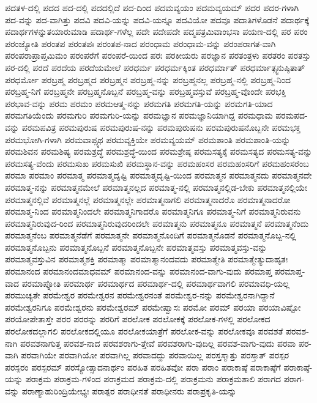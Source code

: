 {ಪದತಳ-ದಲ್ಲಿ
ಪದದ
ಪದ-ದಲ್ಲಿ
ಪದದಲ್ಲಿದೆ
ಪದ-ದಿಂದ
ಪದಮವ್ಯಯಂ
ಪದಮವ್ಯಯಮ್
ಪದರ
ಪದರ-ಗಳಾಗಿ
ಪದ-ವನ್ನು
ಪದ-ವಾಗಿತ್ತು
ಪದವಿ
ಪದವಿ-ಯನ್ನು
ಪದವಿ-ಯನ್ನೂ
ಪದವಿಯೋ
ಪದವೂ
ಪದಾತಿಗಳೊಡನೆ
ಪದಾರ್ಥಕ್ಕೆ
ಪದಾರ್ಥಗಳನ್ನುತಯಾರುಮಾಡಿ
ಪದಾರ್ಥ-ಗಳೆಲ್ಲ
ಪದೇ
ಪದೇಪದೇ
ಪದ್ಮಪತ್ರಮಿವಾಂಭಸಾ
ಪಯಣ-ದಲ್ಲಿ
ಪರ
ಪರಂ
ಪರಂಜ್ಯೋತಿ
ಪರಂತಪ
ಪರಂತಪಃ
ಪರಂತಪ-ನಾದ
ಪರಂಧಾಮ
ಪರಂಧಾಮ-ವನ್ನು
ಪರಂಪರಾಗತ-ವಾಗಿ
ಪರಂಪರಾಪ್ರಾಪ್ತಮಿಮಂ
ಪರಂಪರೆಗೆ
ಪರಂಪರೆ-ಯಿಂದ
ಪರಃ
ಪರಕೀಯರು
ಪರಜ್ಞಾನ
ಪರತಂತ್ರಳು
ಪರತರಂ
ಪರತಸ್ತು
ಪರ-ದಲ್ಲಿ
ಪರದೆ
ಪರದೆಯ
ಪರದೆಯಮೇಲೆ
ಪರಧರ್ಮ
ಪರಧರ್ಮಕ್ಕಿಂತ
ಪರಧರ್ಮಾತ್
ಪರಧರ್ಮಾತ್ಸ್ವನುಷ್ಠಿತಾತ್
ಪರಧರ್ಮೋ
ಪರಬ್ರಹ್ಮ
ಪರಬ್ರಹ್ಮದ
ಪರಬ್ರಹ್ಮನ
ಪರಬ್ರಹ್ಮ-ನನ್ನು
ಪರಬ್ರಹ್ಮನಲ್ಲ
ಪರಬ್ರಹ್ಮ-ನಲ್ಲಿ
ಪರಬ್ರಹ್ಮ-ನಿಂದ
ಪರಬ್ರಹ್ಮ-ನಿಗೆ
ಪರಬ್ರಹ್ಮನೇ
ಪರಬ್ರಹ್ಮನೊಬ್ಬನೆ
ಪರಬ್ರಹ್ಮ-ವನ್ನು
ಪರಬ್ರಹ್ಮವಸ್ತುವೆ
ಪರಬ್ರಹ್ಮ-ವೊಂದೇ
ಪರಭಕ್ತಿ
ಪರಭಾವ-ವನ್ನು
ಪರಮ
ಪರಮಂ
ಪರಮಆತ್ಮ-ನನ್ನು
ಪರಮಗತಿ
ಪರಮಗತಿ-ಯನ್ನು
ಪರಮಗತಿ-ಯಾದ
ಪರಮಗತಿಯೆಂದು
ಪರಮಗುರಿ
ಪರಮಗುರಿ-ಯನ್ನು
ಪರಮಜ್ಞಾನ
ಪರಮಜ್ಞಾನಿಯಾಗಿದ್ದ
ಪರಮಧಾಮ
ಪರಮಪದ-ವನ್ನು
ಪರಮಪವಿತ್ರ
ಪರಮಪುರುಷ
ಪರಮಪುರುಷ-ನನ್ನು
ಪರಮಪುರುಷನು
ಪರಮಪುರುಷನೊಬ್ಬನೇ
ಪರಮಭಕ್ತ
ಪರಮಭೋಗಿ-ಗಳಾಗಿ
ಪರಮವಾಪ್ಸ್ಯಥ
ಪರಮವ್ಯಕ್ತಿಯೇ
ಪರಮವ್ಯಯಮ್
ಪರಮಶಾಂತಿ
ಪರಮಶಾಂತಿ-ಯನ್ನು
ಪರಮಶಿವನ
ಪರಮಶಿಷ್ಯ
ಪರಮಶ್ರದ್ಧೆ
ಪರಮಶ್ರದ್ಧೆ-ಯಿಂದ
ಪರಮಶ್ರೇಷ್ಠ
ಪರಮಸತ್ಯಕ್ಕೆ
ಪರಮಸತ್ಯದ
ಪರಮಸತ್ಯ-ವನ್ನು
ಪರಮಸತ್ಯ-ವೆಂದು
ಪರಮಸುಖ
ಪರಮಸುಖಿ
ಪರಮಸ್ಥಾನ-ವನ್ನು
ಪರಮಹಂಸರ
ಪರಮಹಂಸರಿಗೆ
ಪರಮಹಂಸರೆಂಬ
ಪರಮಾ
ಪರಮಾಂ
ಪರಮಾತ್ಮ
ಪರಮಾತ್ಮದೃಷ್ಟಿ
ಪರಮಾತ್ಮದೃಷ್ಟಿ-ಯಿಂದ
ಪರಮಾತ್ಮನ
ಪರಮಾತ್ಮನದು
ಪರಮಾತ್ಮನದೇ
ಪರಮಾತ್ಮ-ನನ್ನು
ಪರಮಾತ್ಮನಮೇಲೆ
ಪರಮಾತ್ಮನಲ್ಲದ
ಪರಮಾತ್ಮ-ನಲ್ಲಿ
ಪರಮಾತ್ಮನಲ್ಲಿಡ-ಬೇಕು
ಪರಮಾತ್ಮನಲ್ಲಿಯೇ
ಪರಮಾತ್ಮನಲ್ಲಿವೆ
ಪರಮಾತ್ಮನಲ್ಲೆ
ಪರಮಾತ್ಮನಲ್ಲೇ
ಪರಮಾತ್ಮನಾಗಲಿ
ಪರಮಾತ್ಮನಾದರೊ
ಪರಮಾತ್ಮನಾದರೋ
ಪರಮಾತ್ಮ-ನಿಂದ
ಪರಮಾತ್ಮನಿಂದಲೇ
ಪರಮಾತ್ಮನಿಗಾದರೊ
ಪರಮಾತ್ಮನಿಗೂ
ಪರಮಾತ್ಮ-ನಿಗೆ
ಪರಮಾತ್ಮನಿರುವನು
ಪರಮಾತ್ಮನಿರುವುದ-ರಿಂದ
ಪರಮಾತ್ಮನಿರುವುದರಿಂದಲೇ
ಪರಮಾತ್ಮನು
ಪರಮಾತ್ಮನೂ
ಪರಮಾತ್ಮನೆ
ಪರಮಾತ್ಮನೆಂದು
ಪರಮಾತ್ಮನೆಂಬ
ಪರಮಾತ್ಮನೆಡೆಗೆ
ಪರಮಾತ್ಮನೇ
ಪರಮಾತ್ಮನೊಂದಿಗೆ
ಪರಮಾತ್ಮನೊಡನೆ
ಪರಮಾತ್ಮನೊಬ್ಬ-ನಲ್ಲಿ
ಪರಮಾತ್ಮನೊಬ್ಬನು
ಪರಮಾತ್ಮನೊಬ್ಬನೆ
ಪರಮಾತ್ಮನೊಬ್ಬನೇ
ಪರಮಾತ್ಮವಸ್ತು
ಪರಮಾತ್ಮವಸ್ತು-ವನ್ನು
ಪರಮಾತ್ಮವಸ್ತುವಿನ
ಪರಮಾತ್ಮಶಕ್ತಿ
ಪರಮಾತ್ಮಾ
ಪರಮಾತ್ಮಾನಂದವದು
ಪರಮಾತ್ಮೇತಿ
ಪರಮಾತ್ಮೇತ್ಯುದಾಹೃತಃ
ಪರಮಾನಂದ
ಪರಮಾನಂದಮಾಧವಮ್
ಪರಮಾನಂದ-ವನ್ನು
ಪರಮಾನಂದ-ವಾಗು-ವುದು
ಪರಮಾಪ್ತ
ಪರಮಾಪ್ತ-ವಾದ
ಪರಮಾಪ್ನೋತಿ
ಪರಮಾರ್ಥ
ಪರಮಾರ್ಥದ
ಪರಮಾರ್ಥ-ದಲ್ಲಿ
ಪರಮಾರ್ಥವಾಗಲಿ
ಪರಮಾವಧಿ-ಯಲ್ಲ
ಪರಮುಚ್ಯತೇ
ಪರಮೇಶ್ವರ
ಪರಮೇಶ್ವರನ
ಪರಮೇಶ್ವರನಂತೆ
ಪರಮೇಶ್ವರ-ನನ್ನು
ಪರಮೇಶ್ವರನಾಗಿದ್ದಾನೆ
ಪರಮೇಶ್ವರನಿಗೂ
ಪರಮೇಶ್ವರನು
ಪರಮೇಶ್ವರಮ್
ಪರಮೇಷ್ವಾಸಃ
ಪರಮೋ
ಪರಮ್
ಪರಯಾ
ಪರಯಾವಿಷ್ಟೋ
ಪರಯೋಪೇತಾಸ್ತೇ
ಪರರ
ಪರರನ್ನು
ಪರರಿಗೆ
ಪರಲೋಕ
ಪರಲೋಕಕ್ಕೆ
ಪರಲೋಕ-ಗಳಲ್ಲಿ
ಪರಲೋಕದ
ಪರಲೋಕದಲ್ಲಾಗಲಿ
ಪರಲೋಕದಲ್ಲಿಯೂ
ಪರಲೋಕಯಾತ್ರೆಗೆ
ಪರಲೋಕ-ವನ್ನು
ಪರಲೋಕವೂ
ಪರವಶತೆ
ಪರವಶ-ನಾಗಿ
ಪರವಶನಾಗುತ್ತ
ಪರವಶ-ನಾದ
ಪರವಶರಾಗು-ತ್ತೇವೆ
ಪರವಶರಾಗು-ವುದಿಲ್ಲ
ಪರವಶ-ವಾಗು-ವುದು
ಪರವಾ
ಪರ-ವಾಗಿ
ಪರವಾಗಿಯೇ
ಪರವಾಗಿಯೋ
ಪರವಾಗಿಲ್ಲ
ಪರವಾದದ್ದು
ಪರವಾಯಿಲ್ಲ
ಪರಸ್ತಸ್ಮಾತ್ತು
ಪರಸ್ತಾತ್
ಪರಸ್ಪರ
ಪರಸ್ಪರಂ
ಪರಸ್ಪರಮ್
ಪರಸ್ಯೋತ್ಸಾದನಾರ್ಥಂ
ಪರಹಿತ
ಪರಹಿತವೋ
ಪರಾ
ಪರಾಂ
ಪರಾಕಾಷ್ಠೆ
ಪರಾಕಾಷ್ಠೆಗೆ
ಪರಾಕಾಷ್ಠೆ-ಯನ್ನು
ಪರಾಕ್ರಮ
ಪರಾಕ್ರಮ-ಗಳಿಂದ
ಪರಾಕ್ರಮದ
ಪರಾಕ್ರಮ-ದಲ್ಲಿ
ಪರಾಕ್ರಮನು
ಪರಾಕ್ರಮಶಾಲಿ
ಪರಾಗದ
ಪರಾಗ-ವನ್ನು
ಪರಾಣ್ಯಾಹುರಿಂದ್ರಿಯೇಭ್ಯಃ
ಪರಾತ್ಪರ
ಪರಾಧೀನತೆ
ಪರಾಧೀನರು
ಪರಾಪ್ರಕೃತಿ-ಯನ್ನು
}

